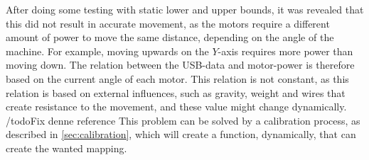 After doing some testing with static lower and upper bounds, it was revealed that this did not result in accurate movement, as the motors require a different amount of power to move the same distance, depending on the angle of the machine.
For example, moving upwards on the $Y$-axis requires more power than moving down.
The relation between the USB-data and motor-power is therefore based on the current angle of each motor.
This relation is not constant, as this relation is based on external influences, such as gravity, weight and wires that create resistance to the movement, and these value might change dynamically.
/todo{Fix denne reference}
This problem can be solved by a calibration process, as described in \autoref{sec:calibration}, which will create a function, dynamically, that can create the wanted mapping.